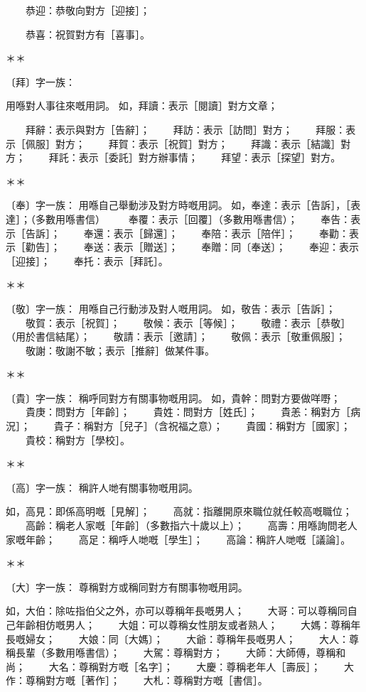 　　恭迎：恭敬向對方［迎接］；

　　恭喜：祝賀對方有［喜事］。  
  
＊＊  
  
〔拜〕字一族：

用喺對人事往來嘅用詞。  
如，拜讀：表示［閱讀］對方文章；

　　拜辭：表示與對方［告辭］；  
　　拜訪：表示［訪問］對方；  
　　拜服：表示［佩服］對方；  
　　拜賀：表示［祝賀］對方；  
　　拜識：表示［結識］對方；  
　　拜託：表示［委託］對方辦事情；  
　　拜望：表示［探望］對方。  
  
＊＊  
  
〔奉〕字一族：  
用喺自己舉動涉及對方時嘅用詞。  
如，奉達：表示［告訴］，［表達］；（多數用喺書信）  
　　奉覆：表示［回覆］（多數用喺書信）；  
　　奉告：表示［告訴］；  
　　奉還：表示［歸還］；  
　　奉陪：表示［陪伴］；  
　　奉勸：表示［勸告］；  
　　奉送：表示［贈送］；  
　　奉贈：同〔奉送〕；  
　　奉迎：表示［迎接］；  
　　奉托：表示［拜託］。  
  
＊＊  
  
〔敬〕字一族：  
用喺自己行動涉及對人嘅用詞。  
如，敬告：表示［告訴］；  
　　敬賀：表示［祝賀］；  
　　敬候：表示［等候］；  
　　敬禮：表示［恭敬］（用於書信結尾）；  
　　敬請：表示［邀請］；  
　　敬佩：表示［敬重佩服］；  
　　敬謝：敬謝不敏；表示［推辭］做某件事。  
  
＊＊  
  
〔貴〕字一族：  
稱呼同對方有關事物嘅用詞。  
如，貴幹：問對方要做咩嘢；  
　　貴庚：問對方［年齡］；  
　　貴姓：問對方［姓氏］；  
　　貴恙：稱對方［病況］；  
　　貴子：稱對方［兒子］（含祝福之意）；  
　　貴國：稱對方［國家］；  
　　貴校：稱對方［學校］。  
  
＊＊  
  
〔高〕字一族：  
稱許人哋有關事物嘅用詞。

如，高見：即係高明嘅［見解］；  
　　高就：指離開原來職位就任較高嘅職位；  
　　高齡：稱老人家嘅［年齡］（多數指六十歲以上）；  
　　高壽：用喺詢問老人家嘅年齡；  
　　高足：稱呼人哋嘅［學生］；  
　　高論：稱許人哋嘅［議論］。  
  
＊＊  
  
〔大〕字一族：  
尊稱對方或稱同對方有關事物嘅用詞。

如，大伯：除咗指伯父之外，亦可以尊稱年長嘅男人；  
　　大哥：可以尊稱同自己年齡相仿嘅男人；  
　　大姐：可以尊稱女性朋友或者熟人；  
　　大媽：尊稱年長嘅婦女；  
　　大娘：同〔大媽〕；  
　　大爺：尊稱年長嘅男人；  
　　大人：尊稱長輩（多數用喺書信）；  
　　大駕：尊稱對方；  
　　大師：大師傅，尊稱和尚；  
　　大名：尊稱對方嘅［名字］；  
　　大慶：尊稱老年人［壽辰］；  
　　大作：尊稱對方嘅［著作］；  
　　大札：尊稱對方嘅［書信］。  
  
